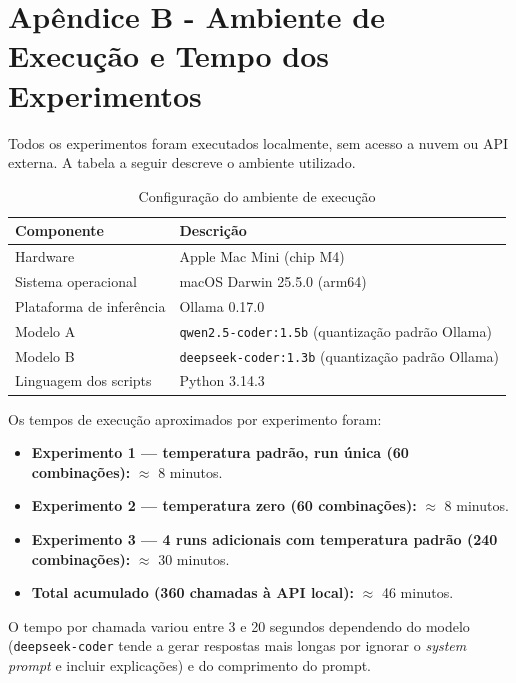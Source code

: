 \documentclass[12pt,
    english,
    french,
    spanish,
    brazil,
    ]{article}
\begin{document}
\section*{Apêndice B - Ambiente de Execução e Tempo dos Experimentos}\label{apendiceb}

Todos os experimentos foram executados localmente, sem acesso a nuvem ou API externa. A tabela a seguir descreve o ambiente utilizado.

\begin{table}[H]
\centering
\caption*{Configuração do ambiente de execução}
\begin{tabular}{ll}
\toprule
\textbf{Componente} & \textbf{Descrição} \\
\midrule
Hardware         & Apple Mac Mini (chip M4) \\
Sistema operacional & macOS Darwin 25.5.0 (arm64) \\
Plataforma de inferência & Ollama 0.17.0 \\
Modelo A         & \texttt{qwen2.5-coder:1.5b} (quantização padrão Ollama) \\
Modelo B         & \texttt{deepseek-coder:1.3b} (quantização padrão Ollama) \\
Linguagem dos scripts & Python 3.14.3 \\
\bottomrule
\end{tabular}
\end{table}

Os tempos de execução aproximados por experimento foram:

\begin{itemize}
    \item \textbf{Experimento 1 — temperatura padrão, run única (60 combinações):} $\approx$ 8 minutos.
    \item \textbf{Experimento 2 — temperatura zero (60 combinações):} $\approx$ 8 minutos.
    \item \textbf{Experimento 3 — 4 runs adicionais com temperatura padrão (240 combinações):} $\approx$ 30 minutos.
    \item \textbf{Total acumulado (360 chamadas à API local):} $\approx$ 46 minutos.
\end{itemize}

O tempo por chamada variou entre 3 e 20 segundos dependendo do modelo (\texttt{deepseek-coder} tende a gerar respostas mais longas por ignorar o \textit{system prompt} e incluir explicações) e do comprimento do prompt.

\end{document}
